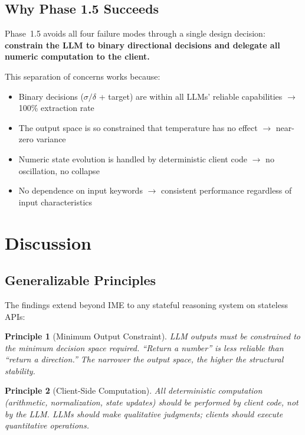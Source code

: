 \documentclass[11pt,a4paper]{article}
\newtheorem{principle}{Principle}
\begin{document}
\subsection{Why Phase 1.5 Succeeds}

Phase~1.5 avoids all four failure modes through a single design decision:
\textbf{constrain the LLM to binary directional decisions and delegate all
numeric computation to the client.}

This separation of concerns works because:
\begin{itemize}
    \item Binary decisions ($\sigma/\delta$ + target) are within all LLMs'
    reliable capabilities $\rightarrow$ 100\% extraction rate
    \item The output space is so constrained that temperature has no effect
    $\rightarrow$ near-zero variance
    \item Numeric state evolution is handled by deterministic client code
    $\rightarrow$ no oscillation, no collapse
    \item No dependence on input keywords $\rightarrow$ consistent performance
    regardless of input characteristics
\end{itemize}

\section{Discussion}
\label{sec:discussion}

\subsection{Generalizable Principles}

The findings extend beyond IME to any stateful reasoning system on stateless APIs:

\begin{principle}[Minimum Output Constraint]
LLM outputs must be constrained to the minimum decision space required. ``Return
a number'' is less reliable than ``return a direction.'' The narrower the output
space, the higher the structural stability.
\end{principle}

\begin{principle}[Client-Side Computation]
All deterministic computation (arithmetic, normalization, state updates) should
be performed by client code, not by the LLM. LLMs should make qualitative
judgments; clients should execute quantitative operations.
\end{principle}
\end{document}
